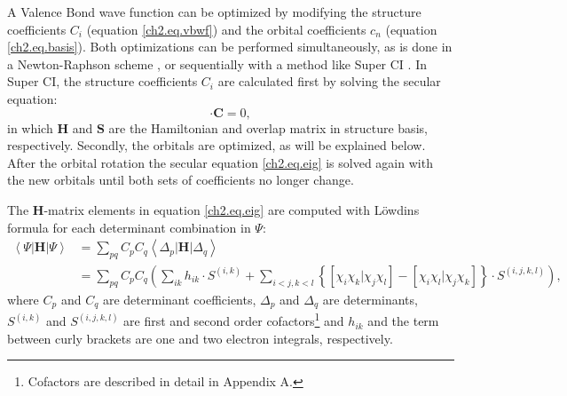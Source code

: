 A Valence Bond wave function can be optimized by modifying the structure coefficients $C_i$ (equation \ref{ch2.eq.vbwf}) and the orbital coefficients $c_n$ (equation \ref{ch2.eq.basis}). Both optimizations can be performed simultaneously, as is done in a Newton-Raphson scheme \cite{zahid}, or sequentially with a method like Super CI \cite{superci1,superci2}. In Super CI, the structure coefficients $C_i$ are calculated first by solving the secular equation:
\begin{equation}
[\mathbf{H}-E\mathbf{S}] \cdot \mathbf{C} = 0,
\label{ch2.eq.eig}
\end{equation}
in which $\mathbf{H}$ and $\mathbf{S}$ are the Hamiltonian and overlap matrix in structure basis, respectively. Secondly, the orbitals are optimized, as will be explained below. After the orbital rotation the secular equation \ref{ch2.eq.eig} is solved again with the new orbitals until both sets of coefficients no longer change.

The $\mathbf{H}$-matrix elements in equation \ref{ch2.eq.eig} are computed with L\"{o}wdins formula for each determinant combination in $\Psi$:
\begin{equation}
\begin{split}
\left< \Psi | \mathbf{H} | \Psi \right> &= \sum_{pq} C_p C_q \left< \Delta_p | \mathbf{H} | \Delta_q \right> \\ 
&= \sum_{pq} C_p C_q \left(\sum_{ik} h_{ik} \cdot S^{(i,k)} + \sum_{i<j,k<l} \left\{ \left[ \chi_i \chi_k | \chi_j \chi_l \right] - \left[ \chi_i \chi_l | \chi_j \chi_k \right] \right\} \cdot S^{(i,j,k,l)}\right),
\end{split}
\label{ch2.eq.lowdindeterminants}
\end{equation}
where $C_p$ and $C_q$ are determinant coefficients, $\Delta_p$ and $\Delta_q$ are determinants, $S^{(i,k)}$ and $S^{(i,j,k,l)}$ are first and second order cofactors\footnote{Cofactors are described in detail in Appendix A.}  and $h_{ik}$ and the term between curly brackets are one and two electron integrals, respectively.

